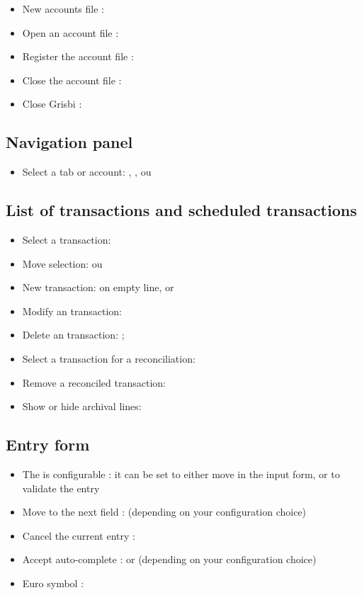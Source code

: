 \begin{itemize}
	\item New accounts file : 
	\item Open an account file : 
	\item Register the account file : 
	\item Close the account file : 
	\item Close Grisbi : 
\end{itemize}


\subsection{Navigation panel}

\begin{itemize}
	\item Select a tab or account: , ,  ou 
\end{itemize}

\subsection{List of transactions and scheduled transactions}

\begin{itemize}
	\item Select a transaction: 
	\item Move selection: ou 
	\item New transaction:   on empty line, or 
	\item Modify an transaction: 
	\item Delete an transaction:  ;
	\item Select a transaction for a reconciliation:
	\item Remove a reconciled transaction: 
	\item Show or hide archival lines: 
\end{itemize}


\subsection{Entry form }

\begin{itemize}
	\item The  is configurable : it can be set to either move in the input form, or to validate the entry
	\item Move to the next field :  (depending on your configuration choice)
	\item Cancel the current entry : 
	\item Accept auto-complete :  or  (depending on your configuration choice)
	\item  Euro symbol : 
\end{itemize}

